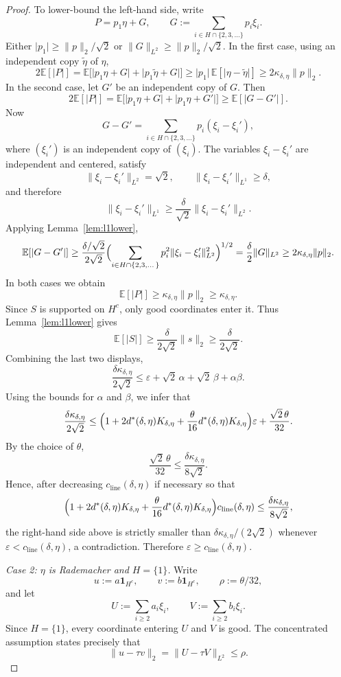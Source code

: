 \documentclass[11pt]{amsart}
\numberwithin{equation}{section}
\theoremstyle{definition}
\theoremstyle{remark}
\newcommand{\E}{\mathbb E}
\newcommand{\eps}{\varepsilon}
\newcommand{\abs}[1]{\lvert #1 \rvert}
\newcommand{\norm}[1]{\lVert #1 \rVert}
\begin{document}
\begin{proof}
	To lower-bound the left-hand side, write
	\[
	P=p_1\eta+G,
	\qquad
	G:=\sum_{i\in H\cap\{2,3,\dots\}} p_i\xi_i.
	\]
	Either $\abs{p_1}\ge \norm{p}_2/\sqrt2$ or $\norm{G}_{L^2}\ge \norm{p}_2/\sqrt2$.
	In the first case, using an independent copy $\widetilde\eta$ of $\eta$,
	\[
	2\E[\abs{P}]
	=\E\bigl[\abs{p_1\eta+G}+\abs{p_1\widetilde\eta+G}\bigr]
	\ge
	\abs{p_1}\,\E[\abs{\eta-\widetilde\eta}]
	\ge
	2\kappa_{\delta,\eta}\norm{p}_2.
	\]
	In the second case, let $G'$ be an independent copy of $G$.  Then
	\[
	2\E[\abs{P}]
	=\E\bigl[\abs{p_1\eta+G}+\abs{p_1\eta+G'}\bigr]
	\ge \E[\abs{G-G'}].
	\]
	Now
	\[
	G-G'
	=
	\sum_{i\in H\cap\{2,3,\dots\}} p_i(\xi_i-\xi_i'),
	\]
	where $(\xi_i')$ is an independent copy of $(\xi_i)$.  The variables
	$\xi_i-\xi_i'$ are independent and centered, satisfy
	\[
	\norm{\xi_i-\xi_i'}_{L^2}=\sqrt2,
	\qquad
	\norm{\xi_i-\xi_i'}_{L^1}\ge \delta,
	\]
	and therefore
	\[
	\norm{\xi_i-\xi_i'}_{L^1}
	\ge \frac{\delta}{\sqrt2}\norm{\xi_i-\xi_i'}_{L^2}.
	\]
	Applying Lemma~\ref{lem:l1lower},
	\[
	\E[\abs{G-G'}]
	\ge
	\frac{\delta/\sqrt2}{2\sqrt2}
	\Bigl(\sum_{i\in H\cap\{2,3,\dots\}} p_i^2
	\norm{\xi_i-\xi_i'}_{L^2}^2\Bigr)^{1/2}
	=\frac{\delta}{2}\norm{G}_{L^2}
	\ge 2\kappa_{\delta,\eta}\norm{p}_2.
	\]
	In both cases we obtain
	\[
	\E[\abs{P}]
	\ge \kappa_{\delta,\eta}\norm{p}_2
	\ge \kappa_{\delta,\eta}.
	\]
	Since $S$ is supported on $H^c$, only good coordinates enter it.  Thus
	Lemma~\ref{lem:l1lower} gives
	\[
	\E[\abs{S}]
	\ge \frac{\delta}{2\sqrt2}\norm{s}_2
	\ge \frac{\delta}{2\sqrt2}.
	\]
	Combining the last two displays,
	\[
	\frac{\delta\kappa_{\delta,\eta}}{2\sqrt2}
	\le
	\eps+\sqrt2\,\alpha+\sqrt2\,\beta+\alpha\beta.
	\]
	Using the bounds for $\alpha$ and $\beta$, we infer that
	\[
	\frac{\delta\kappa_{\delta,\eta}}{2\sqrt2}
	\le
	\Bigl(1+2d^*(\delta,\eta)K_{\delta,\eta}
	+\frac{\theta}{16}d^*(\delta,\eta)K_{\delta,\eta}\Bigr)\eps
	+\frac{\sqrt2\,\theta}{32}.
	\]
	By the choice of $\theta$,
	\[
	\frac{\sqrt2\,\theta}{32}
	\le \frac{\delta\kappa_{\delta,\eta}}{8\sqrt2}.
	\]
	Hence, after decreasing $c_{\mathrm{line}}(\delta,\eta)$ if necessary so that
	\[
	\Bigl(1+2d^*(\delta,\eta)K_{\delta,\eta}
	+\frac{\theta}{16}d^*(\delta,\eta)K_{\delta,\eta}\Bigr)
	c_{\mathrm{line}}(\delta,\eta)
	\le \frac{\delta\kappa_{\delta,\eta}}{8\sqrt2},
	\]
	the right-hand side above is strictly smaller than
	$\delta\kappa_{\delta,\eta}/(2\sqrt2)$ whenever
	$\eps<c_{\mathrm{line}}(\delta,\eta)$, a contradiction.  Therefore
	$\eps\ge c_{\mathrm{line}}(\delta,\eta)$.

\smallskip
\noindent\emph{Case 2: $\eta$ is Rademacher and $H=\{1\}$.}
Write
\[
u:=a\mathbf 1_{H^c},
\qquad
v:=b\mathbf 1_{H^c},
\qquad
\rho:=\theta/32,
\]
and let
\[
U:=\sum_{i\ge2} a_i\xi_i,
\qquad
V:=\sum_{i\ge2} b_i\xi_i.
\]
Since $H=\{1\}$, every coordinate entering $U$ and $V$ is good.  The
concentrated assumption states precisely that
\[
\norm{u-\tau v}_2=\norm{U-\tau V}_{L^2}\le \rho.
\]


\end{proof}
\end{document}
